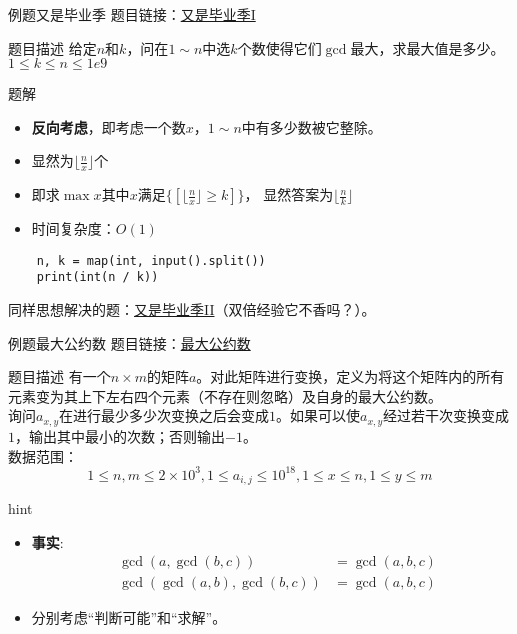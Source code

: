 \begin{frame}[fragile]{例题}{又是毕业季}
  题目链接：\href{https://www.luogu.com.cn/problem/P1372}{又是毕业季I}
  \begin{block}{题目描述}
    给定$n$和$k$，问在$1\sim n$中选$k$个数使得它们$\gcd$最大，求最大值是多少。\\
    $1 \leq k\leq n\le 1e9$
  \end{block}
  \pause
  \begin{exampleblock}{题解}
    \begin{itemize}
      \item \textbf{反向考虑}，即考虑一个数$x$，$1\sim n$中有多少数被它整除。
      \pause
      \item 显然为$\lfloor \frac{n}{x} \rfloor$个
      \item 即求$\max{x}$其中$x$满足$\{[\lfloor \frac{n}{x} \rfloor \geq k]\}$，
      显然答案为$\lfloor \frac{n}{k} \rfloor$
      \pause
      \item 时间复杂度：$O(1)$
    \end{itemize}
  \end{exampleblock}
  \pause
  \begin{lstlisting}
    n, k = map(int, input().split())
    print(int(n / k))
  \end{lstlisting}
  \pause
  同样思想解决的题：\href{https://www.luogu.com.cn/problem/P1414}{又是毕业季II}（双倍经验它不香吗？）。
\end{frame}

\begin{frame}[fragile]{例题}{最大公约数}
  题目链接：\href{https://www.luogu.com.cn/problem/P7243}{最大公约数}
  \begin{block}{题目描述}
    有一个$n \times m$的矩阵$a$。对此矩阵进行变换，定义为将这个矩阵内的所有元素变为其上下左右四个元素（不存在则忽略）及自身的最大公约数。\\询问$a_{x,y}$在进行最少多少次变换之后会变成$1$。如果可以使$a_{x,y}$经过若干次变换变成$1$，输出其中最小的次数；否则输出$-1$。\\
    \vspace{0.3cm}
    \pause
    数据范围：
    $$
    1\le n,m\le 2\times 10^3, 1\le a_{i,j}\le 10^{18}, 1\le x\le n,1\le y\le m
    $$
  \end{block}
  \vspace{0.3cm}
  \pause
  \begin{alertblock}{hint}
    \begin{itemize}
      \item \textbf{事实}:
      $$
      \begin{aligned}
        &\gcd(a,\gcd(b,c))&=\gcd(a,b,c)\\
        &\gcd(\gcd(a,b),\gcd(b,c))&=\gcd(a,b,c)
      \end{aligned}
      $$
      \item 分别考虑“判断可能”和“求解”。
    \end{itemize}
  \end{alertblock}
\end{frame}

